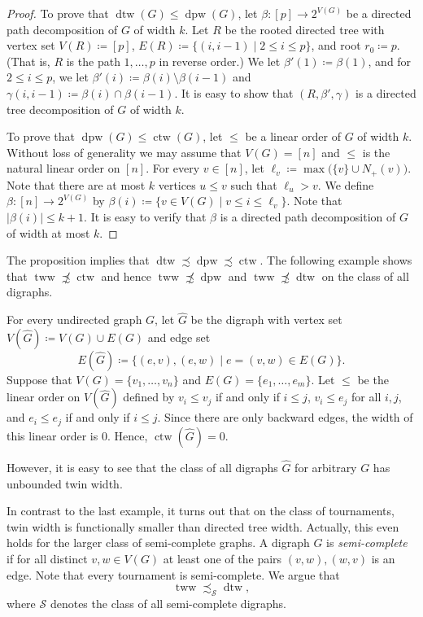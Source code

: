\documentclass{theoretics}
\newcommand{\CS}{{\mathcal S}}
\newcommand{\bigmid}{\;\big|\;}
\DeclareMathOperator{\dtw}{dtw}
\DeclareMathOperator{\tww}{tww}
\DeclareMathOperator{\dpw}{dpw}
\DeclareMathOperator{\ctw}{ctw}
\begin{document}
\begin{proof}
 To prove that $\dtw(G) \leq \dpw(G)$, let $\beta\colon [p] \to 2^{V(G)}$ be a directed path decomposition of $G$ of width $k$.
 Let $R$ be the rooted directed tree with vertex set $V(R) \coloneqq [p]$, $E(R) \coloneqq \{(i,i-1) \mid 2 \leq i \leq p\}$, and root $r_0 \coloneqq p$.
 (That is, $R$ is the path $1,\ldots,p$ in reverse order.)
 We let $\beta'(1)\coloneqq \beta(1)$, and for $2 \leq i\leq p$, we let $\beta'(i) \coloneqq \beta(i) \setminus \beta(i-1)$ and $\gamma(i,i-1) \coloneqq \beta(i) \cap \beta(i-1)$.
 It is easy to show that $(R,\beta',\gamma)$ is a directed tree decomposition of $G$ of width $k$.

 To prove that $\dpw(G) \leq \ctw(G)$, let $\leq$ be a linear order of $G$ of width $k$.
 Without loss of generality we may assume that $V(G) = [n]$ and $\leq$ is the natural linear order on $[n]$.
 For every $v \in [n]$, let $\ell_v \coloneqq \max\big(\{v\} \cup N_+(v)\big)$.
 Note that there are at most $k$ vertices $u \leq v$ such that $\ell_u > v$.
 We define $\beta\colon [n] \to 2^{V(G)}$ by $\beta(i) \coloneqq \{v \in V(G) \mid v \leq i \leq \ell_v\}$.
 Note that $|\beta(i)| \leq k+1$.
 It is easy to verify that $\beta$ is a directed path decomposition of $G$ of width at most $k$.
\end{proof}

The proposition implies that $\dtw \precsim \dpw \precsim \ctw$.
The following example shows that $\tww \not\precsim \ctw$ and hence $\tww \not\precsim \dpw$ and $\tww \not\precsim \dtw$ on the class of all digraphs.

\begin{example}
 For every undirected graph $G$, let $\widehat G$ be the digraph with vertex set $V(\widehat G)\coloneqq V(G)\cup E(G)$ and edge set
 \[E(\widehat G) \coloneqq \big\{(e,v),(e,w) \bigmid e = (v,w) \in E(G)\big\}.\]
 Suppose that $V(G) = \{v_1,\dots,v_n\}$ and $E(G) = \{e_1,\dots,e_m\}$.
 Let $\leq$ be the linear order on $V(\widehat G)$ defined by $v_i \leq v_j$ if and only if $i \leq j$,
 $v_i \leq e_j$ for all $i,j$, and $e_i \leq e_j$ if and only if $i \leq j$.
 Since there are only backward edges, the width of this linear order is $0$.
 Hence, $\ctw(\widehat G)=0$.

 However, it is easy to see that the class of all digraphs $\widehat G$ for arbitrary $G$ has unbounded twin width.
\end{example}

In contrast to the last example, it turns out that on the class of tournaments, twin width is functionally smaller than directed tree width.
Actually, this even holds for the larger class of semi-complete graphs.
A digraph $G$ is \emph{semi-complete} if for all distinct $v,w \in V(G)$ at least one of the pairs $(v,w),(w,v)$ is an edge.
Note that every tournament is semi-complete.
We argue that
\begin{equation}
 \label{eq:tww-leq-dtw}
 \tww\precsim_{\CS}\dtw,
\end{equation}
where $\CS$ denotes the class of all semi-complete digraphs.
\end{document}

